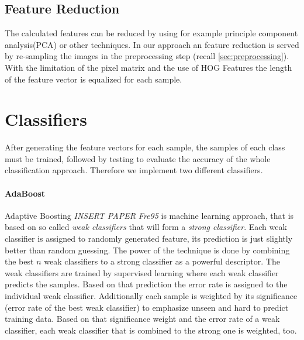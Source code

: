 \documentclass[a4paper,10pt]{article}
\begin{document}
\subsection{Feature Reduction}

The calculated features can be reduced by using for example principle component analysis(PCA) or other techniques.
In our approach an feature reduction is served by re-sampling the images in the preprocessing step (recall \autoref{sec:preprocessing}).
With the limitation of the pixel matrix and the use of HOG Features the length of the feature vector is equalized for each sample.

\section{Classifiers}

After generating the feature vectors for each sample, the samples of each class must be trained, followed by testing to evaluate the accuracy of the whole classification approach. 
Therefore we implement two different classifiers. 

\paragraph{AdaBoost}
Adaptive Boosting \emph{INSERT PAPER Fre95} is machine learning approach, that is based on so called \textit{weak classifiers} that will form a \textit{strong classifier}. Each weak classifier is assigned to randomly generated feature, its prediction is just slightly better than random guessing. The power of the technique is done by combining the best $n$ weak classifiers to a strong classifier as a powerful descriptor. The weak classifiers are trained by supervised learning where each weak classifier predicts the samples. Based on that prediction the error rate is assigned to the individual weak classifier. Additionally each sample is weighted by its significance (error rate of the best weak classifier) to emphasize unseen and hard to predict training data. Based on that significance weight and the error rate of a weak classifier, each weak classifier that is combined to the strong one is weighted, too.
\end{document}
